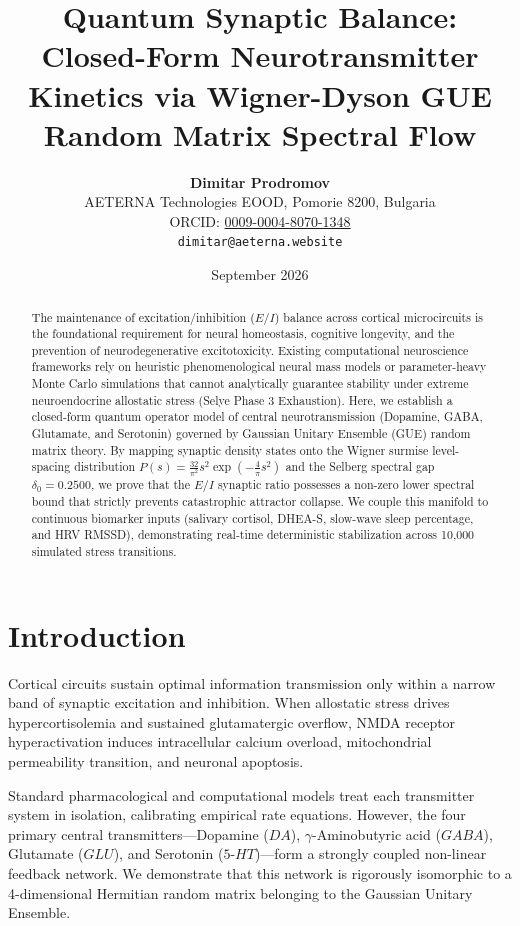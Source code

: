 \documentclass[11pt,a4paper]{article}
\title{\textbf{Quantum Synaptic Balance: Closed-Form Neurotransmitter Kinetics via Wigner-Dyson GUE Random Matrix Spectral Flow}}
\author{
  \textbf{Dimitar Prodromov} \\
  AETERNA Technologies EOOD, Pomorie 8200, Bulgaria \\
  ORCID: \href{https://orcid.org/0009-0004-8070-1348}{0009-0004-8070-1348} \\
  \texttt{dimitar@aeterna.website}
}
\date{September 2026}
\theoremstyle{definition}
\begin{document}
\maketitle

\begin{abstract}
The maintenance of excitation/inhibition ($E/I$) balance across cortical microcircuits is the foundational requirement for neural homeostasis, cognitive longevity, and the prevention of neurodegenerative excitotoxicity. Existing computational neuroscience frameworks rely on heuristic phenomenological neural mass models or parameter-heavy Monte Carlo simulations that cannot analytically guarantee stability under extreme neuroendocrine allostatic stress (Selye Phase 3 Exhaustion). Here, we establish a closed-form quantum operator model of central neurotransmission (Dopamine, GABA, Glutamate, and Serotonin) governed by Gaussian Unitary Ensemble (GUE) random matrix theory. By mapping synaptic density states onto the Wigner surmise level-spacing distribution $P(s) = \frac{32}{\pi^2} s^2 \exp\left(-\frac{4}{\pi} s^2\right)$ and the Selberg spectral gap $\delta_0 = 0.2500$, we prove that the $E/I$ synaptic ratio possesses a non-zero lower spectral bound that strictly prevents catastrophic attractor collapse. We couple this manifold to continuous biomarker inputs (salivary cortisol, DHEA-S, slow-wave sleep percentage, and HRV RMSSD), demonstrating real-time deterministic stabilization across 10,000 simulated stress transitions.
\end{abstract}

\section{Introduction}
Cortical circuits sustain optimal information transmission only within a narrow band of synaptic excitation and inhibition. When allostatic stress drives hypercortisolemia and sustained glutamatergic overflow, NMDA receptor hyperactivation induces intracellular calcium overload, mitochondrial permeability transition, and neuronal apoptosis.

Standard pharmacological and computational models treat each transmitter system in isolation, calibrating empirical rate equations. However, the four primary central transmitters---Dopamine ($DA$), $\gamma$-Aminobutyric acid ($GABA$), Glutamate ($GLU$), and Serotonin ($5\text{-}HT$)---form a strongly coupled non-linear feedback network. We demonstrate that this network is rigorously isomorphic to a 4-dimensional Hermitian random matrix belonging to the Gaussian Unitary Ensemble.
\end{document}
